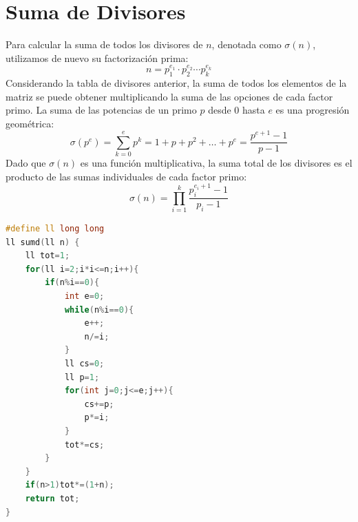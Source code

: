 \documentclass{article}
\begin{document}
\section*{Suma de Divisores}
Para calcular la suma de todos los divisores de $n$, denotada como $\sigma(n)$, utilizamos de nuevo su factorización prima:
\begin{equation}
    n = p_1^{e_1} \cdot p_2^{e_2} \cdots p_k^{e_k}
\end{equation}
Considerando la tabla de divisores anterior, la suma de todos los elementos de la matriz se puede obtener multiplicando la suma de las opciones de cada factor primo. La suma de las potencias de un primo $p$ desde $0$ hasta $e$ es una progresión geométrica:
\begin{equation}
    \sigma(p^e) = \sum_{k=0}^{e} p^k = 1 + p + p^2 + \dots + p^e = \frac{p^{e+1}-1}{p-1}
\end{equation}
Dado que $\sigma(n)$ es una función multiplicativa, la suma total de los divisores es el producto de las sumas individuales de cada factor primo:
\begin{equation}
    \sigma(n) = \prod_{i=1}^{k} \frac{p_i^{e_i+1}-1}{p_i-1}
\end{equation}
\begin{lstlisting}[language=C++]
#define ll long long
ll sumd(ll n) {
    ll tot=1;
    for(ll i=2;i*i<=n;i++){
        if(n%i==0){
            int e=0;
            while(n%i==0){
                e++;
                n/=i;
            }
            ll cs=0;
            ll p=1;
            for(int j=0;j<=e;j++){
                cs+=p;
                p*=i;
            }
            tot*=cs;
        }
    }
    if(n>1)tot*=(1+n);
    return tot;
}
\end{lstlisting}
\end{document}
